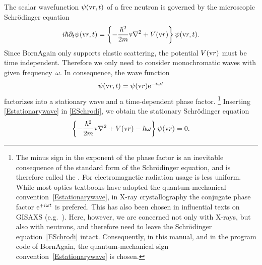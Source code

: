\def\Vmac{\tilde{V}}

%
The scalar wavefunction $\psi(\text{v}{r},t)$
%
%
%
of a free neutron
is governed by the microscopic Schrödinger equation
\begin{equation}\label{ESchrodi}
  i\hbar\partial_t \psi(\text{v}{r},t)
  = \left\{-\frac{\hbar^2}{2m}\text{v}{\nabla}^2+V(\text{v}{r})\right\} \psi(\text{v}{r},t).
\end{equation}
Since BornAgain only supports elastic scattering,
%
%
the potential $V(\text{v}{r})$ must be time independent.
%
Therefore we only need to consider monochromatic waves
%
%
with given frequency~$\omega$.
%
In consequence, the wave function
\begin{equation}\label{Estationarywave}
  \psi(\text{v}{r},t) = \psi(\text{v}{r})\mathrm e^{-i\omega t}
\end{equation}
%
factorizes into a stationary wave and a time-dependent phase factor.%
%
%
\footnote
{The minus sign in the exponent of the phase factor
is an inevitable consequence of the standard form of the Schrödinger equation,
and is therefore called the .
%
%
%
For electromagnetic radiation
usage is less uniform.
While most optics textbooks
have adopted the quantum-mechanical convention~\cref{Estationarywave},
%
in X-ray crystallography
the conjugate phase factor $\mathrm e^{+i\omega t}$ is prefered.
This 
%
has also been chosen
in influential texts on GISAXS (e.g.\ \cite{ReLL09}).
Here, however, we are concerned not only with X-rays,
but also with neutrons,
and therefore need to leave the Schrödinger equation~\cref{ESchrodi} intact.
Consequently, in this manual, and in the program code of BornAgain,
the quantum-mechanical sign convention~\cref{Estationarywave}
%
is chosen.}
Inserting \cref{Estationarywave} in \cref{ESchrodi},
we obtain the stationary Schrödinger equation
\begin{equation}\label{EstatSchrodi}
  \left\{-\frac{\hbar^2}{2m}\text{v}{\nabla}^2+V(\text{v}{r})-\hbar\omega\right\} \psi(\text{v}{r}) = 0.
\end{equation}
